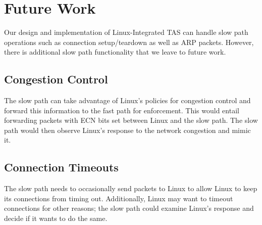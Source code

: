 \section{Future Work}\label{Future}

Our design and implementation of Linux-Integrated TAS can handle slow path
operations such as connection setup/teardown as well as ARP packets. However,
there is additional slow path functionality that we leave to future work.

\subsection{Congestion Control}
The slow path can take advantage of Linux's policies for congestion control
and forward this information to the fast path for enforcement. This would entail
forwarding packets with ECN bits set between Linux and the slow path. The slow
path would then observe Linux's response to the network congestion and mimic
it.

\subsection{Connection Timeouts}
The slow path needs to occasionally send packets to Linux to allow Linux to keep
its connections from timing out. Additionally, Linux may want to timeout
connections for other reasons; the slow path could examine Linux's response and
decide if it wants to do the same.

